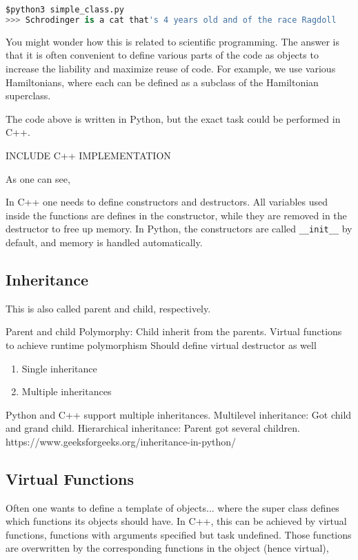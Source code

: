 \lstset{basicstyle=\scriptsize}
\begin{lstlisting}[language=python]
$python3 simple_class.py
>>> Schrodinger is a cat that's 4 years old and of the race Ragdoll
\end{lstlisting}

You might wonder how this is related to scientific programming. The answer is that it is often convenient to define various parts of the code as objects to increase the liability and maximize reuse of code. For example, we use various Hamiltonians, where each can be defined as a subclass of the Hamiltonian superclass. 

The code above is written in Python, but the exact task could be performed in C++. 

INCLUDE C++ IMPLEMENTATION

As one can see, 

In C++ one needs to define constructors and destructors. All variables used inside the functions are defines in the constructor, while they are removed in the destructor to free up memory.  In Python, the constructors are called \texttt{\_\_init\_\_} by default, and memory is handled automatically.

\subsection{Inheritance}
This is also called parent and child, respectively. 

Parent and child
Polymorphy: Child inherit from the parents. 
Virtual functions to achieve runtime polymorphism 
Should define virtual destructor as well 

\begin{enumerate}
	\item Single inheritance
	\item Multiple inheritances
\end{enumerate}

Python and C++ support multiple inheritances. Multilevel inheritance: Got child and grand child. Hierarchical inheritance: Parent got several children. https://www.geeksforgeeks.org/inheritance-in-python/

\subsection{Virtual Functions}
Often one wants to define a template of objects... where the super class defines which functions its objects should have. In C++, this can be achieved by virtual functions, functions with arguments specified but task undefined. Those functions are overwritten by the corresponding functions in the object (hence virtual), 